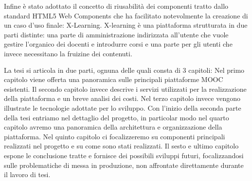 Infine è stato adottato il concetto di riusabilità dei componenti tratto dallo standard HTML5 Web Components che ha facilitato notevolmente la creazione di un caso d'uso finale: X-Learning.
X-learning è una piattaforma strutturata in due parti distinte: una parte di amministrazione indirizzata all'utente che vuole gestire l'organico dei docenti e introdurre corsi e una parte per gli utenti che invece necessitano la fruizine dei contenuti.

La tesi si articola in due parti, ognuna delle quali consta di 3 capitoli:
Nel primo capitolo viene offerta una panoramica sulle principali piattaforme MOOC esistenti.
Il secondo capitolo invece descrive i servizi utilizzati per la realizzazione della piattaforma e un breve analisi dei costi.
Nel terzo capitolo invece vengono illustrate le tecnologie adottate per lo sviluppo.
Con l'inizio della seconda parte della tesi entriamo nel dettaglio del progetto, in particolar modo nel quarto capitolo avremo una panoramica della architettura e organizzazione della piattaforma.
Nel quinto capitolo ci focalizzeremo su componenti principali realizzati nel progetto e su come sono stati realizzati.
Il sesto e ultimo capitolo espone le conclusione tratte e fornisce dei possibili sviluppi futuri, focalizzandosi sulle problematiche di messa in produzione, non affrontate direttamente durante il lavoro di tesi.